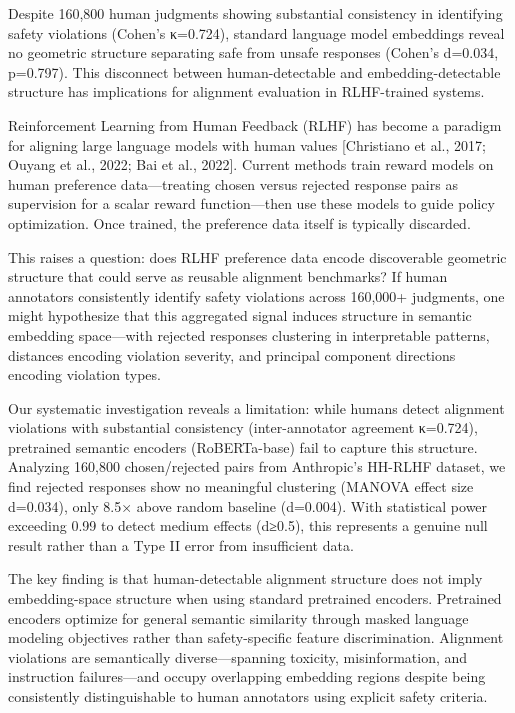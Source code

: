 
Despite 160,800 human judgments showing substantial consistency in identifying safety violations (Cohen's κ=0.724), standard language model embeddings reveal no geometric structure separating safe from unsafe responses (Cohen's d=0.034, p=0.797). This disconnect between human-detectable and embedding-detectable structure has implications for alignment evaluation in RLHF-trained systems.

Reinforcement Learning from Human Feedback (RLHF) has become a paradigm for aligning large language models with human values [Christiano et al., 2017; Ouyang et al., 2022; Bai et al., 2022]. Current methods train reward models on human preference data—treating chosen versus rejected response pairs as supervision for a scalar reward function—then use these models to guide policy optimization. Once trained, the preference data itself is typically discarded.

This raises a question: does RLHF preference data encode discoverable geometric structure that could serve as reusable alignment benchmarks? If human annotators consistently identify safety violations across 160,000+ judgments, one might hypothesize that this aggregated signal induces structure in semantic embedding space—with rejected responses clustering in interpretable patterns, distances encoding violation severity, and principal component directions encoding violation types.

Our systematic investigation reveals a limitation: while humans detect alignment violations with substantial consistency (inter-annotator agreement κ=0.724), pretrained semantic encoders (RoBERTa-base) fail to capture this structure. Analyzing 160,800 chosen/rejected pairs from Anthropic's HH-RLHF dataset, we find rejected responses show no meaningful clustering (MANOVA effect size d=0.034), only 8.5× above random baseline (d=0.004). With statistical power exceeding 0.99 to detect medium effects (d≥0.5), this represents a genuine null result rather than a Type II error from insufficient data.

The key finding is that human-detectable alignment structure does not imply embedding-space structure when using standard pretrained encoders. Pretrained encoders optimize for general semantic similarity through masked language modeling objectives rather than safety-specific feature discrimination. Alignment violations are semantically diverse—spanning toxicity, misinformation, and instruction failures—and occupy overlapping embedding regions despite being consistently distinguishable to human annotators using explicit safety criteria.

